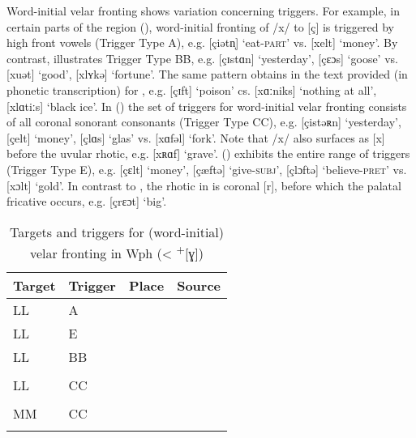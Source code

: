 Word-initial velar fronting shows variation concerning triggers. For example, in  certain parts of the  region (), word-initial fronting of /x/ to [ç] is triggered by high front vowels (Trigger Type A), e.g. [çiətn̩] ‘eat\textsc{{}-part}’ vs. [xelt] ‘money’. By contrast,  illustrates Trigger Type BB, e.g.  [çɪstɑn] ‘yesterday’, [çɛɔs] ‘goose’ vs. [xuət] ‘good’, [xlʏkə] ‘fortune’. The same pattern obtains in the text provided (in phonetic transcription) for  \citep[155-177]{Niebaum1974}, e.g. [çɪft] ‘poison’ cs. [xɑːniks] ‘nothing at all’, [xlɑtiːs] ‘black ice’. In  () the set of triggers for word-initial velar fronting consists of all coronal sonorant consonants (Trigger Type CC), e.g. [çistəʀn] ‘yesterday’, [çelt] ‘money’, [çlɑs] ‘glas’ vs. [xɑfəl] ‘fork’. Note that /x/ also surfaces as [x] before the uvular rhotic, e.g. [xʀɑf] ‘grave’.  () exhibits the entire range of triggers (Trigger Type E), e.g. [çɛlt] ‘money’, [çæftǝ] ‘give\textsc{{}-subj}’, [çlɔftə] ‘believe\textsc{{}-pret}’ vs. [xɔlt] ‘gold’. In contrast to , the rhotic in  is coronal [r], before which the palatal fricative occurs, e.g. [çrɛɔt] ‘big’.

\begin{table}
\caption{Targets and triggers for (word-initial) velar fronting in Wph (< \textsuperscript{+}[ɣ])\label{tab:12.16}}
\begin{tabularx}{\textwidth}{llQQ}
\lsptoprule
Target & Trigger & Place & Source\\\midrule
LL & A &   & \citet{Gregory1934}\\
LL & E &   & \citet{Arens1908}\\
LL & BB &   &       \citet{Holthausen1886}    \\
   &    &   &           \citet{Niebaum1974}\\
LL & CC &   &  \citet{Böger1906}   \\
   &    &   &            \citet{Seymour1970}\\
MM & CC &   & \citet{Beisenherz1907}\\
\lspbottomrule
\end{tabularx}
\end{table}

\pagebreak

